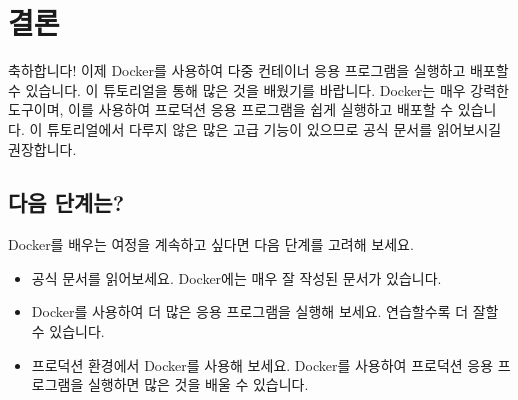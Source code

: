 \chapter{결론}
축하합니다! 이제 Docker를 사용하여 다중 컨테이너 응용 프로그램을 실행하고 배포할 수 있습니다. 이 튜토리얼을 통해 많은 것을 배웠기를 바랍니다. Docker는 매우 강력한 도구이며, 이를 사용하여 프로덕션 응용 프로그램을 쉽게 실행하고 배포할 수 있습니다. 이 튜토리얼에서 다루지 않은 많은 고급 기능이 있으므로 공식 문서를 읽어보시길 권장합니다.

\section{다음 단계는?}
Docker를 배우는 여정을 계속하고 싶다면 다음 단계를 고려해 보세요.
\begin{itemize}
    \item 공식 문서를 읽어보세요. Docker에는 매우 잘 작성된 문서가 있습니다.
    \item Docker를 사용하여 더 많은 응용 프로그램을 실행해 보세요. 연습할수록 더 잘할 수 있습니다.
    \item 프로덕션 환경에서 Docker를 사용해 보세요. Docker를 사용하여 프로덕션 응용 프로그램을 실행하면 많은 것을 배울 수 있습니다.
\end{itemize}